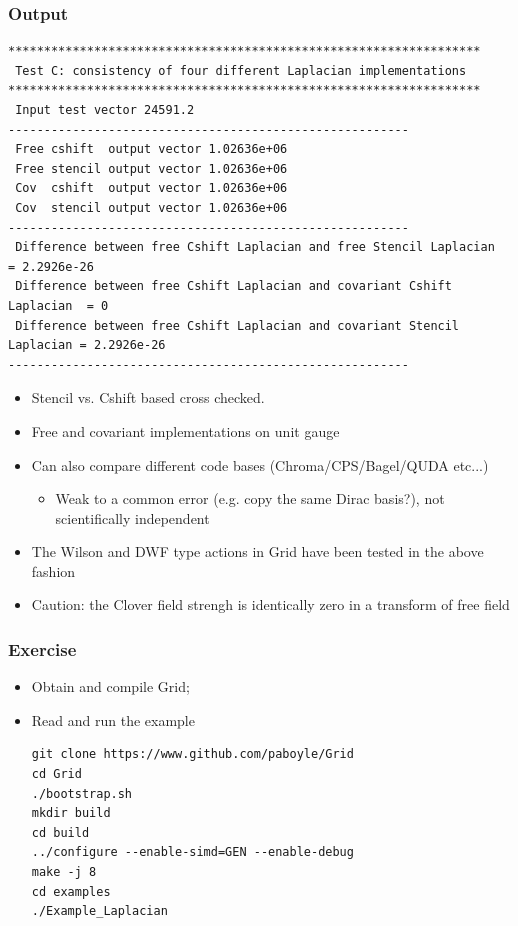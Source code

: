 \documentclass[pdf,ps,8pt]{beamer}
\begin{document}
\begin{frame}[fragile]\small\frametitle{Output}
{\tiny \begin{verbatim}
******************************************************************
 Test C: consistency of four different Laplacian implementations 
******************************************************************
 Input test vector 24591.2
--------------------------------------------------------
 Free cshift  output vector 1.02636e+06
 Free stencil output vector 1.02636e+06
 Cov  cshift  output vector 1.02636e+06
 Cov  stencil output vector 1.02636e+06
--------------------------------------------------------
 Difference between free Cshift Laplacian and free Stencil Laplacian      = 2.2926e-26
 Difference between free Cshift Laplacian and covariant Cshift Laplacian  = 0
 Difference between free Cshift Laplacian and covariant Stencil Laplacian = 2.2926e-26
--------------------------------------------------------
\end{verbatim}
}
  \begin{itemize}
  \item Stencil vs. Cshift based cross checked.
  \item Free and covariant implementations on unit gauge 
  \item Can also compare different code bases (Chroma/CPS/Bagel/QUDA etc...)
  \begin{itemize}
  \item Weak to a common error (e.g. copy the same Dirac basis?), not scientifically independent
  \end{itemize}
  \item The Wilson and DWF type actions in Grid have been tested in the above fashion
  \item Caution: the Clover field strengh is identically zero in a transform of free field
  \end{itemize}

  \end{frame}

\begin{frame}[fragile]\small\frametitle{Exercise}
\begin{itemize}
\item Obtain and compile Grid;
\item Read and run the example
\begin{verbatim}
git clone https://www.github.com/paboyle/Grid
cd Grid
./bootstrap.sh
mkdir build
cd build
../configure --enable-simd=GEN --enable-debug
make -j 8
cd examples
./Example_Laplacian
\end{verbatim}
\end{itemize}
\end{frame}
\end{document}
